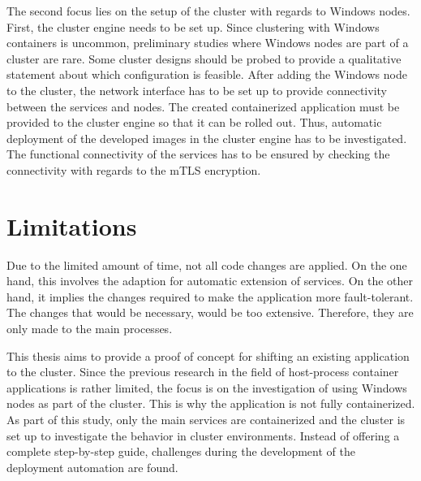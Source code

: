The second focus lies on the setup of the cluster with regards to \ac{Windows} nodes.
First, the cluster engine needs to be set up. Since clustering with \ac{Windows} containers is uncommon, preliminary studies where \ac{Windows} nodes are part of a cluster are rare. Some cluster designs should be probed to provide a qualitative statement about which configuration is feasible.
After adding the \ac{Windows} node to the cluster, the network interface has to be set up to provide connectivity between the services and nodes. 
The created containerized application must be provided to the cluster engine so that it can be rolled out. Thus, automatic deployment of the developed images in the cluster engine has to be investigated. 
The functional connectivity of the services has to be ensured by checking the connectivity with regards to the \ac{mTLS} encryption.


\section{Limitations}
Due to the limited amount of time, not all code changes are applied. On the one hand, this involves the adaption for automatic extension of services. On the other hand, it implies the changes required to make the application more fault-tolerant. The changes that would be necessary, would be too extensive. Therefore, they are only made to the main processes.

This thesis aims to provide a proof of concept for shifting an existing application to the cluster. Since the previous research in the field of host-process container applications is rather limited, the focus is on the investigation of using \ac{Windows} nodes as part of the cluster.
This is why the application is not fully containerized. As part of this study, only the main services are containerized and the cluster is set up to investigate the behavior in cluster environments. 
Instead of offering a complete step-by-step guide, challenges during the development of the deployment automation are found.
